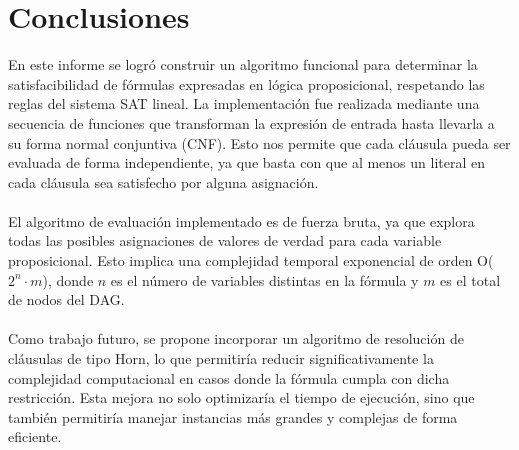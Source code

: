 \documentclass{article}
\begin{document}
\section{Conclusiones}
En este informe se logró construir un algoritmo funcional para determinar la satisfacibilidad de fórmulas expresadas en lógica proposicional, respetando las reglas del sistema SAT lineal. La implementación fue realizada mediante una secuencia de funciones que transforman la expresión de entrada hasta llevarla a su forma normal conjuntiva (CNF). Esto nos permite que cada cláusula pueda ser evaluada de forma independiente, ya que basta con que al menos un literal en cada cláusula sea satisfecho por alguna asignación.
\\\\
El algoritmo de evaluación implementado es de fuerza bruta, ya que explora todas las posibles asignaciones de valores de verdad para cada variable proposicional. Esto implica una complejidad temporal exponencial de orden O($2^n \cdot m$), donde $n$ es el número de variables distintas en la fórmula y $m$ es el total de nodos del DAG.\\\\
Como trabajo futuro, se propone incorporar un algoritmo de resolución de cláusulas de tipo Horn, lo que permitiría reducir significativamente la complejidad computacional en casos donde la fórmula cumpla con dicha restricción. Esta mejora no solo optimizaría el tiempo de ejecución, sino que también permitiría manejar instancias más grandes y complejas de forma eficiente.\\


%
\end{document}
